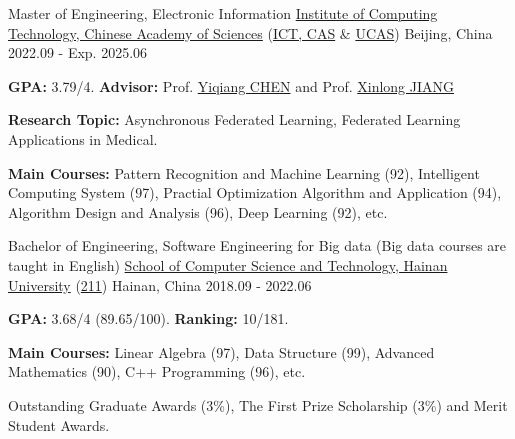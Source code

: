 
\begin{cventries}

\cventry
{Master of Engineering, Electronic Information} %
{\href{http://www.ict.cas.cn/}{Institute of Computing Technology, Chinese Academy of Sciences} (\href{http://www.ict.cas.cn/}{ICT, CAS} \& \href{https://www.ucas.ac.cn/}{UCAS})} %
{Beijing, China} %
{2022.09 - Exp. 2025.06} %
{
  \begin{cvitems} %
    \item {\textbf{GPA:} 3.79/4. \textbf{Advisor:} Prof. \href{https://www.ict.cas.cn/sourcedb_ict_cas/cn/jssrck/200909/t20090917_2496596.html}{Yiqiang CHEN} and Prof. \href{http://english.ict.cas.cn/people/scien/bln/202303/t20230321_328588.html}{Xinlong JIANG}}
    \item {\textbf{Research Topic:} Asynchronous Federated Learning, Federated Learning Applications in Medical.} %
    \item {\textbf{Main Courses:} Pattern Recognition and Machine Learning (92), Intelligent Computing System (97), Practial Optimization Algorithm and Application (94), Algorithm Design and Analysis (96), Deep Learning (92), etc.}
  \end{cvitems}
}

\cventry
{Bachelor of Engineering, Software Engineering for Big data (Big data courses are taught in English)} %
{\href{https://www.hainanu.edu.cn/}{School of Computer Science and Technology, Hainan University} (\href{https://en.wikipedia.org/wiki/Project_211}{211})} %
{Hainan, China} %
{2018.09 - 2022.06} %
{
  \begin{cvitems} %
    \item {\textbf{GPA:} 3.68/4 (89.65/100). \textbf{Ranking:} 10/181.} %
    \item {\textbf{Main Courses:} Linear Algebra (97), Data Structure (99), Advanced Mathematics (90), C++ Programming (96), etc.}
    \item {Outstanding Graduate Awards (3\%), The First Prize Scholarship (3\%) and Merit Student Awards.}
  \end{cvitems}
}

\end{cventries}
